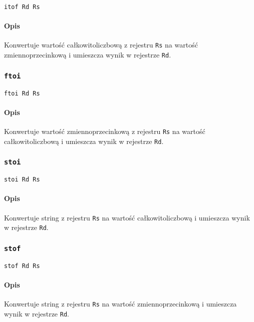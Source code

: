 \begin{lstlisting}
itof Rd Rs
\end{lstlisting}

\paragraph*{Opis} Konwertuje wartość całkowitoliczbową z rejestru \texttt{Rs} na
wartość zmiennoprzecinkową i umieszcza wynik w rejestrze \texttt{Rd}.

\subsubsection{\texttt{ftoi}}

\begin{lstlisting}
ftoi Rd Rs
\end{lstlisting}

\paragraph*{Opis} Konwertuje wartość zmiennoprzecinkową z rejestru \texttt{Rs}
na wartość całkowitoliczbową i umieszcza wynik w rejestrze \texttt{Rd}.

\subsubsection{\texttt{stoi}}

\begin{lstlisting}
stoi Rd Rs
\end{lstlisting}

\paragraph*{Opis} Konwertuje string z rejestru \texttt{Rs} na wartość
całkowitoliczbową i umieszcza wynik w rejestrze \texttt{Rd}.

\subsubsection{\texttt{stof}}

\begin{lstlisting}
stof Rd Rs
\end{lstlisting}

\paragraph*{Opis} Konwertuje string z rejestru \texttt{Rs} na wartość
zmiennoprzecinkową i umieszcza wynik w rejestrze \texttt{Rd}.

